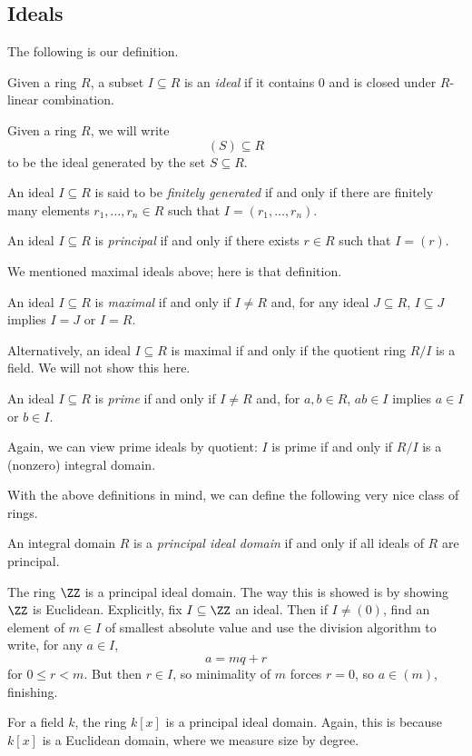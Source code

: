 \subsection{Ideals}
The following is our definition.
\begin{definition}[Ideal]
	Given a ring $R$, a subset $I\subseteq R$ is an \textit{ideal} if it contains $0$ and is closed under $R$-linear combination.
\end{definition}
Given a ring $R$, we will write
\[(S)\subseteq R\]
to be the ideal generated by the set $S\subseteq R$.
\begin{definition}
	An ideal $I\subseteq R$ is said to be \textit{finitely generated} if and only if there are finitely many elements $r_1,\ldots,r_n\in R$ such that $I=(r_1,\ldots,r_n)$.
\end{definition}
\begin{definition}[Principal]
	An ideal $I\subseteq R$ is \textit{principal} if and only if there exists $r\in R$ such that $I=(r)$.
\end{definition}
We mentioned maximal ideals above; here is that definition.
\begin{definition}[Maximal]
	An ideal $I\subseteq R$ is \textit{maximal} if and only if $I\ne R$ and, for any ideal $J\subseteq R$, $I\subseteq J$ implies $I=J$ or $I=R$.
\end{definition}
Alternatively, an ideal $I\subseteq R$ is maximal if and only if the quotient ring $R/I$ is a field. We will not show this here.
\begin{definition}[Prime]
	An ideal $I\subseteq R$ is \textit{prime} if and only if $I\ne R$ and, for $a,b\in R$, $ab\in I$ implies $a\in I$ or $b\in I$.
\end{definition}
Again, we can view prime ideals by quotient: $I$ is prime if and only if $R/I$ is a (nonzero) integral domain.

With the above definitions in mind, we can define the following very nice class of rings.
\begin{definition}
	An integral domain $R$ is a \textit{principal ideal domain} if and only if all ideals of $R$ are principal.
\end{definition}
\begin{example}
	The ring $\ZZ$ is a principal ideal domain. The way this is showed is by showing $\ZZ$ is Euclidean. Explicitly, fix $I\subseteq\ZZ$ an ideal. Then if $I\ne(0)$, find an element of $m\in I$ of smallest absolute value and use the division algorithm to write, for any $a\in I$,
	\[a=mq+r\]
	for $0\le r<m$. But then $r\in I$, so minimality of $m$ forces $r=0$, so $a\in(m)$, finishing.
\end{example}
\begin{example}
	For a field $k$, the ring $k[x]$ is a principal ideal domain. Again, this is because $k[x]$ is a Euclidean domain, where we measure size by degree.
\end{example}

